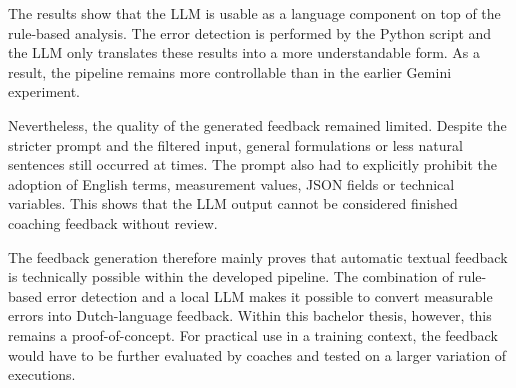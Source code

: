 The results show that the LLM is usable as a language component on top of the rule-based analysis. The error detection is performed by the Python script and the LLM only translates these results into a more understandable form. As a result, the pipeline remains more controllable than in the earlier Gemini experiment.

Nevertheless, the quality of the generated feedback remained limited. Despite the stricter prompt and the filtered input, general formulations or less natural sentences still occurred at times. The prompt also had to explicitly prohibit the adoption of English terms, measurement values, JSON fields or technical variables. This shows that the LLM output cannot be considered finished coaching feedback without review.

The feedback generation therefore mainly proves that automatic textual feedback is technically possible within the developed pipeline. The combination of rule-based error detection and a local LLM makes it possible to convert measurable errors into Dutch-language feedback. Within this bachelor thesis, however, this remains a proof-of-concept. For practical use in a training context, the feedback would have to be further evaluated by coaches and tested on a larger variation of executions.
